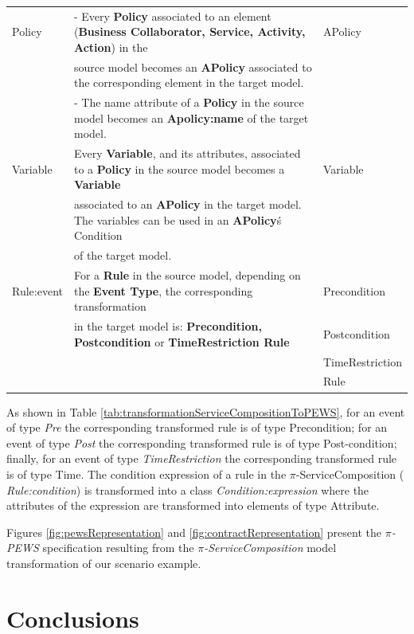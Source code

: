 \begin{table}[ht!]
\begin{tabular}{l|l|l}
    \hline

    Policy   & - Every \textbf{Policy} associated to an element
    (\textbf{Business Collaborator, Service, Activity, Action}) in the   &
    APolicy\\
    & source model becomes an \textbf{APolicy} associated to the corresponding
element in the target model. & \\
   & - The name attribute of a \textbf{Policy} in the source model becomes an
\textbf{Apolicy:name} of the target model. & \\
    \hline
    Variable   &  Every \textbf{Variable}, and its attributes, associated to a
    \textbf{Policy} in the source model
    becomes a \textbf{Variable}   & Variable\\
    &associated to an \textbf{APolicy} in the target
    model. The variables can be used in an \textbf{APolicy}\'s Condition &\\
    & of the target model.&\\
    \hline
    Rule:event &  For a \textbf{Rule} in the source
    model, depending on the \textbf{Event Type}, the corresponding transformation
    & Precondition \\ &   in the target model is: \textbf{Precondition,
    Postcondition} or \textbf{TimeRestriction Rule}  & Postcondition\\
    &&TimeRestriction\\
    &&Rule\\
    \hline
\end{tabular}
\end{table}

As shown in Table \ref{tab:transformationServiceCompositionToPEWS}, for an event
of type {\sc\em Pre} the corresponding transformed rule is of type {\sc
Precondition}; for an event of type {\sc\em Post} the corresponding transformed
rule is of type {\sc Post-condition}; finally, for an event of type {\sc\em
TimeRestriction} the corresponding transformed rule is of type {\sc Time}. The
condition expression of a rule in the $\pi$-ServiceComposition ({\sc\em
Rule:condition}) is transformed into a class {\sc\em Condition:expression} where
the attributes of the expression are transformed into elements of type {\sc
Attribute}.

Figures \ref{fig:pewsRepresentation} and \ref{fig:contractRepresentation}
present the \textit{$\pi$-PEWS} specification resulting from the
\textit{$\pi$-ServiceComposition} model transformation of our scenario example.

\section{Conclusions}
\label{sec:pisodm_conclusion}


